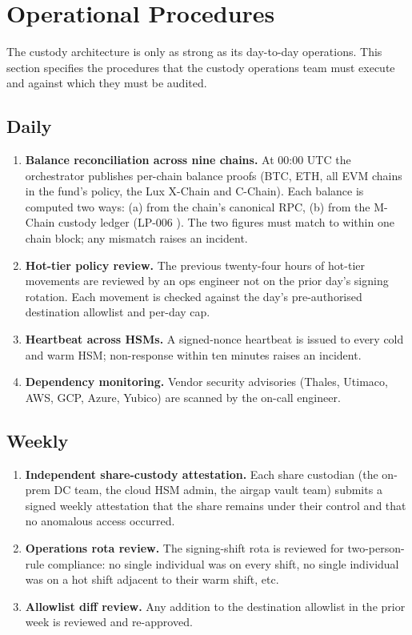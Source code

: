 \section{Operational Procedures}

\label{sec:ops}

The custody architecture is only as strong as its day-to-day
operations. This section specifies the procedures that the custody
operations team must execute and against which they must be audited.

\subsection{Daily}

\begin{enumerate}[nosep]
\item \textbf{Balance reconciliation across nine chains.} At
00:00 UTC the orchestrator publishes per-chain balance proofs (BTC,
ETH, all EVM chains in the fund's policy, the Lux X-Chain and
C-Chain). Each balance is computed two ways: (a) from the chain's
canonical RPC, (b) from the M-Chain custody ledger
(LP-006 \cite{lp006}). The two figures must match to within one
chain block; any mismatch raises an incident.
\item \textbf{Hot-tier policy review.} The previous twenty-four hours
of hot-tier movements are reviewed by an ops engineer not on the
prior day's signing rotation. Each movement is checked against the
day's pre-authorised destination allowlist and per-day cap.
\item \textbf{Heartbeat across HSMs.} A signed-nonce heartbeat is
issued to every cold and warm HSM; non-response within ten minutes
raises an incident.
\item \textbf{Dependency monitoring.} Vendor security advisories
(Thales, Utimaco, AWS, GCP, Azure, Yubico) are scanned by the on-call
engineer.
\end{enumerate}

\subsection{Weekly}

\begin{enumerate}[nosep]
\item \textbf{Independent share-custody attestation.} Each share
custodian (the on-prem DC team, the cloud HSM admin, the airgap vault
team) submits a signed weekly attestation that the share remains
under their control and that no anomalous access occurred.
\item \textbf{Operations rota review.} The signing-shift rota is
reviewed for two-person-rule compliance: no single individual was
on every shift, no single individual was on a hot shift adjacent to
their warm shift, etc.
\item \textbf{Allowlist diff review.} Any addition to the destination
allowlist in the prior week is reviewed and re-approved.
\end{enumerate}

